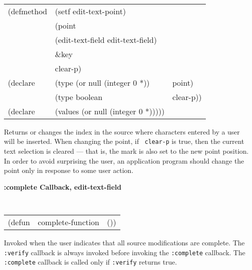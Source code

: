 \begin{flushright} \parbox[t]{6.125in}{
\tt
\begin{tabular}{lll}
\raggedright
(defmethod & (setf edit-text-point) & \\
         & (point \\
         & (edit-text-field  edit-text-field)\\
         & \&key\\
         & clear-p) \\
(declare &(type (or null (integer 0 *)) & point)\\
         &(type boolean &  clear-p))\\
(declare & (values (or null (integer 0 *)))))
\end{tabular}
\rm}
\end{flushright}

\begin{flushright} \parbox[t]{6.125in}{
Returns or changes the index in the
source where characters entered by a user will be inserted. When
changing the point, if {\tt
clear-p} is true, then the current text selection is cleared --- that
is, the mark is also
set to the new point position. In order to avoid
surprising the user, an application program should change the point only in
response to some user action.
 } 
\end{flushright}











{\samepage
{\large {\bf :complete \hfill Callback, edit-text-field}} 
\begin{flushright} 
\parbox[t]{6.125in}{
\tt
\begin{tabular}{lll}
\raggedright
(defun & complete-function & ())
\end{tabular}
\rm

}\end{flushright}}

\begin{flushright} \parbox[t]{6.125in}{
Invoked when the user indicates that all source modifications are complete.
The {\tt :verify} callback
is always invoked before invoking the {\tt :complete} callback. The {\tt
:complete} callback is called only if 
{\tt :verify} returns true.

}\end{flushright}


